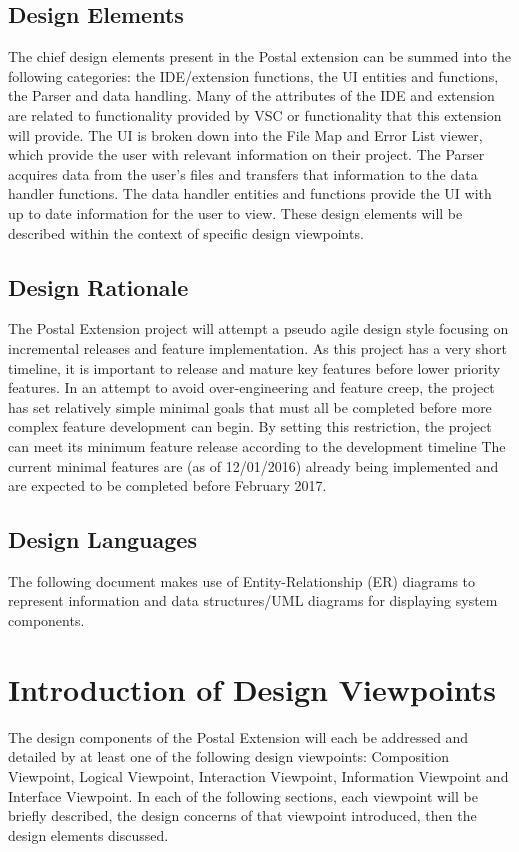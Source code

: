 \documentclass[letterpaper,10pt,titlepage,draftclsnofoot,onecolumn,onesided] {IEEEtran}
\begin{document}
\subsection{Design Elements}
The chief design elements present in the Postal extension can be summed into the following categories: the IDE/extension functions, the UI entities and functions, the Parser and data handling.
Many of the attributes of the IDE and extension are related to functionality provided by VSC or functionality that this extension will provide. 
The UI is broken down into the File Map and Error List viewer, which provide the user with relevant information on their project.
The Parser acquires data from the user's files and transfers that information to the data handler functions.
The data handler entities and functions provide the UI with up to date information for the user to view.
These design elements will be described within the context of specific design viewpoints.

\subsection{Design Rationale}
The Postal Extension project will attempt a pseudo agile design style focusing on incremental releases and feature implementation.
As this project has a very short timeline, it is important to release and mature key features before lower priority features. 
In an attempt to avoid over-engineering and feature creep, the project has set relatively simple minimal goals that must all be completed before more complex feature development can begin.
By setting this restriction, the project can meet its minimum feature release according to the development timeline
The current minimal features are (as of 12/01/2016) already being implemented and are expected to be completed before February 2017.


\subsection{Design Languages}
The following document makes use of Entity-Relationship (ER) diagrams to represent information and data structures/UML diagrams for displaying system components. 

\section{Introduction of Design Viewpoints}
The design components of the Postal Extension will each be addressed and detailed by at least one of the following design viewpoints: Composition Viewpoint, Logical Viewpoint, Interaction Viewpoint, Information Viewpoint and Interface Viewpoint.
In each of the following sections, each viewpoint will be briefly described, the design concerns of that viewpoint introduced, then the design elements discussed.
\end{document}
